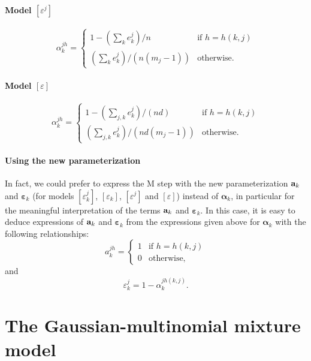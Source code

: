 \documentclass[12pt]{article}
\newcommand{\balpha}{\boldsymbol{\alpha}}
\newcommand{\bvarepsilon}{\boldsymbol{\varepsilon}}
\begin{document}
\paragraph{Model $[\varepsilon^j]$}
\begin{equation}
  \alpha_k^{jh} =
  \left\{
    \begin{array}{ll}
      1-(\sum_k e_k^j) / n & \mbox{if $h=h(k,j)$} \\
      (\sum_k e_k^j) / (n(m_j-1)) & \mbox{otherwise.}
    \end{array}
  \right.
\end{equation}

\paragraph{Model $[\varepsilon]$}
\begin{equation}
  \alpha_k^{jh} =
  \left\{
    \begin{array}{ll}
      1-(\sum_{j,k} e_k^j) / (nd) & \mbox{if $h=h(k,j)$} \\
      (\sum_{j,k} e_k^j) / (nd(m_j-1)) & \mbox{otherwise.}
    \end{array}
  \right.
\end{equation}

\paragraph{Using the new parameterization}
In fact, we could prefer to express the M step with the new parameterization ${\bf a}_k$ and
$\bvarepsilon_k$ (for models $[\varepsilon_k^j]$, $[\varepsilon_k]$, $[\varepsilon^j]$ and
$[\varepsilon]$) instead of $\balpha_k$, in particular for the meaningful interpretation of the
terms ${\bf a}_k$ and $\bvarepsilon_k$. In this case, it is easy to deduce expressions of ${\bf
  a}_k$ and $\bvarepsilon_k$ from the expressions given above for $\balpha_k$ with the
following relationships:
\begin{equation}
  a_k^{jh} =
  \left\{
    \begin{array}{ll}
      1 & \mbox{if $h=h(k,j)$} \\
      0 & \mbox{otherwise,}
    \end{array}
  \right.
\end{equation}
and
\begin{equation}
  \varepsilon_k^j = 1 - \alpha_k^{jh(k,j)}.
\end{equation}

\section{The Gaussian-multinomial mixture model}
\end{document}
